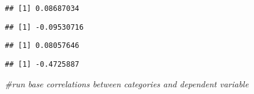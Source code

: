 \documentclass[
]{article}
\newenvironment{Shaded}{\begin{snugshade}}{\end{snugshade}}
\newcommand{\CommentTok}[1]{\textcolor[rgb]{0.56,0.35,0.01}{\textit{#1}}}
\newcommand{\KeywordTok}[1]{\textcolor[rgb]{0.13,0.29,0.53}{\textbf{#1}}}
\newcommand{\NormalTok}[1]{#1}
\newcommand{\OperatorTok}[1]{\textcolor[rgb]{0.81,0.36,0.00}{\textbf{#1}}}
\begin{document}
\begin{Shaded}
\end{Shaded}

\begin{verbatim}
## [1] 0.08687034
\end{verbatim}

\begin{Shaded}
\end{Shaded}

\begin{verbatim}
## [1] -0.09530716
\end{verbatim}

\begin{Shaded}
\end{Shaded}

\begin{verbatim}
## [1] 0.08057646
\end{verbatim}

\begin{Shaded}
\end{Shaded}

\begin{verbatim}
## [1] -0.4725887
\end{verbatim}

\begin{Shaded}
\begin{Highlighting}[]
\CommentTok{#run base correlations between categories and dependent variable}
\end{Highlighting}
\end{Shaded}
\end{document}
